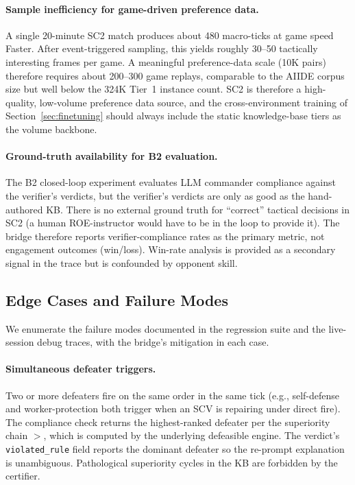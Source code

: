 \documentclass{article}
\theoremstyle{definition}
\begin{document}
\paragraph{Sample inefficiency for game-driven preference data.} A single 20-minute SC2 match produces about 480 macro-ticks at game speed Faster. After event-triggered sampling, this yields roughly 30--50 tactically interesting frames per game. A meaningful preference-data scale (10K pairs) therefore requires about 200--300 game replays, comparable to the AIIDE corpus size but well below the 324K Tier~1 instance count. SC2 is therefore a high-quality, low-volume preference data source, and the cross-environment training of Section~\ref{sec:finetuning} should always include the static knowledge-base tiers as the volume backbone.

\paragraph{Ground-truth availability for B2 evaluation.} The B2 closed-loop experiment evaluates LLM commander compliance against the verifier's verdicts, but the verifier's verdicts are only as good as the hand-authored KB. There is no external ground truth for ``correct'' tactical decisions in SC2 (a human ROE-instructor would have to be in the loop to provide it). The bridge therefore reports verifier-compliance rates as the primary metric, not engagement outcomes (win/loss). Win-rate analysis is provided as a secondary signal in the trace but is confounded by opponent skill.


\subsection{Edge Cases and Failure Modes}\label{subsec:sc2live-edge}

We enumerate the failure modes documented in the regression suite and the live-session debug traces, with the bridge's mitigation in each case.

\paragraph{Simultaneous defeater triggers.} Two or more defeaters fire on the same order in the same tick (e.g., self-defense and worker-protection both trigger when an SCV is repairing under direct fire). The compliance check returns the highest-ranked defeater per the superiority chain $>$, which is computed by the underlying defeasible engine. The verdict's \texttt{violated\_rule} field reports the dominant defeater so the re-prompt explanation is unambiguous. Pathological superiority cycles in the KB are forbidden by the certifier.
\end{document}

